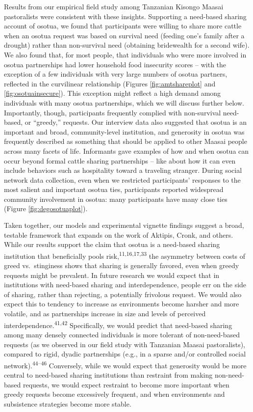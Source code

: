 \documentclass[
]{article}
\begin{document}
Results from our empirical field study among Tanzanian Kisongo Maasai pastoralists were consistent with these insights. Supporting a need-based sharing account of osotua, we found that participants were willing to share more cattle when an osotua request was based on survival need (feeding one's family after a drought) rather than non-survival need (obtaining bridewealth for a second wife). We also found that, for most people, that individuals who were more involved in osotua partnerships had lower household food insecurity scores -- with the exception of a few individuals with very large numbers of osotua partners, reflected in the curvilinear relationship (Figures \ref{fig:amtshareplot} and \ref{fig:osotuainsecure}). This exception might reflect a high demand among individuals with many osotua partnerships, which we will discuss further below. Importantly, though, participants frequently complied with non-survival need-based, or ``greedy,'' requests. Our interview data also suggested that osotua is an important and broad, community-level institution, and generosity in osotua was frequently described as something that should be applied to other Maasai people across many facets of life. Informants gave examples of how and when osotua can occur beyond formal cattle sharing partnerships -- like about how it can even include behaviors such as hospitality toward a traveling stranger. During social network data collection, even when we restricted participants' responses to the most salient and important osotua ties, participants reported widespread community involvement in osotua: many participants have many close ties (Figure \ref{fig:degosotuaplot}).

Taken together, our models and experimental vignette findings suggest a broad, testable framework that expands on the work of Aktipis, Cronk, and others. While our results support the claim that osotua is a need-based sharing institution that beneficially pools risk,\textsuperscript{11,16,17,33} the asymmetry between costs of greed vs.~stinginess shows that sharing is generally favored, even when greedy requests might be prevalent. In future research we would expect that in institutions with need-based sharing and interdependence, people err on the side of sharing, rather than rejecting, a potentially frivolous request. We would also expect this to tendency to increase as environments become harsher and more volatile, and as partnerships increase in size and levels of perceived interdependence.\textsuperscript{41,42} Specifically, we would predict that need-based sharing among many densely connected individuals is more tolerant of non-need-based requests (as we observed in our field study with Tanzanian Maasai pastoralists), compared to rigid, dyadic partnerships (e.g., in a sparse and/or controlled social network).\textsuperscript{44--46} Conversely, while we would expect that generosity would be more central to need-based sharing institutions than restraint from making non-need-based requests, we would expect restraint to become more important when greedy requests become excessively frequent, and when environments and subsistence strategies become more stable.
\end{document}
